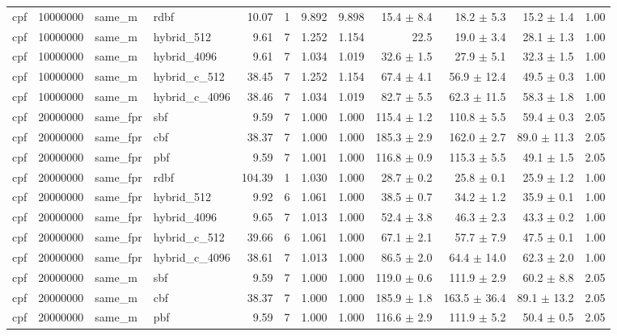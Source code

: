 \begin{tabular}{llllrrrrrrrr}
cpf & 10000000 & same\_m & rdbf & 10.07 & 1 & 9.892 & 9.898 & 15.4 $\pm$ 8.4 & 18.2 $\pm$ 5.3 & 15.2 $\pm$ 1.4 & 1.00 \\
cpf & 10000000 & same\_m & hybrid\_512 & 9.61 & 7 & 1.252 & 1.154 & 22.5 & 19.0 $\pm$ 3.4 & 28.1 $\pm$ 1.3 & 1.00 \\
cpf & 10000000 & same\_m & hybrid\_4096 & 9.61 & 7 & 1.034 & 1.019 & 32.6 $\pm$ 1.5 & 27.9 $\pm$ 5.1 & 32.3 $\pm$ 1.5 & 1.00 \\
cpf & 10000000 & same\_m & hybrid\_c\_512 & 38.45 & 7 & 1.252 & 1.154 & 67.4 $\pm$ 4.1 & 56.9 $\pm$ 12.4 & 49.5 $\pm$ 0.3 & 1.00 \\
cpf & 10000000 & same\_m & hybrid\_c\_4096 & 38.46 & 7 & 1.034 & 1.019 & 82.7 $\pm$ 5.5 & 62.3 $\pm$ 11.5 & 58.3 $\pm$ 1.8 & 1.00 \\
cpf & 20000000 & same\_fpr & sbf & 9.59 & 7 & 1.000 & 1.000 & 115.4 $\pm$ 1.2 & 110.8 $\pm$ 5.5 & 59.4 $\pm$ 0.3 & 2.05 \\
cpf & 20000000 & same\_fpr & cbf & 38.37 & 7 & 1.000 & 1.000 & 185.3 $\pm$ 2.9 & 162.0 $\pm$ 2.7 & 89.0 $\pm$ 11.3 & 2.05 \\
cpf & 20000000 & same\_fpr & pbf & 9.59 & 7 & 1.001 & 1.000 & 116.8 $\pm$ 0.9 & 115.3 $\pm$ 5.5 & 49.1 $\pm$ 1.5 & 2.05 \\
cpf & 20000000 & same\_fpr & rdbf & 104.39 & 1 & 1.030 & 1.000 & 28.7 $\pm$ 0.2 & 25.8 $\pm$ 0.1 & 25.9 $\pm$ 1.2 & 1.00 \\
cpf & 20000000 & same\_fpr & hybrid\_512 & 9.92 & 6 & 1.061 & 1.000 & 38.5 $\pm$ 0.7 & 34.2 $\pm$ 1.2 & 35.9 $\pm$ 0.1 & 1.00 \\
cpf & 20000000 & same\_fpr & hybrid\_4096 & 9.65 & 7 & 1.013 & 1.000 & 52.4 $\pm$ 3.8 & 46.3 $\pm$ 2.3 & 43.3 $\pm$ 0.2 & 1.00 \\
cpf & 20000000 & same\_fpr & hybrid\_c\_512 & 39.66 & 6 & 1.061 & 1.000 & 67.1 $\pm$ 2.1 & 57.7 $\pm$ 7.9 & 47.5 $\pm$ 0.1 & 1.00 \\
cpf & 20000000 & same\_fpr & hybrid\_c\_4096 & 38.61 & 7 & 1.013 & 1.000 & 86.5 $\pm$ 2.0 & 64.4 $\pm$ 14.0 & 62.3 $\pm$ 2.0 & 1.00 \\
cpf & 20000000 & same\_m & sbf & 9.59 & 7 & 1.000 & 1.000 & 119.0 $\pm$ 0.6 & 111.9 $\pm$ 2.9 & 60.2 $\pm$ 8.8 & 2.05 \\
cpf & 20000000 & same\_m & cbf & 38.37 & 7 & 1.000 & 1.000 & 185.9 $\pm$ 1.8 & 163.5 $\pm$ 36.4 & 89.1 $\pm$ 13.2 & 2.05 \\
cpf & 20000000 & same\_m & pbf & 9.59 & 7 & 1.000 & 1.000 & 116.6 $\pm$ 2.9 & 111.9 $\pm$ 5.2 & 50.4 $\pm$ 0.5 & 2.05 \\

\end{tabular}

